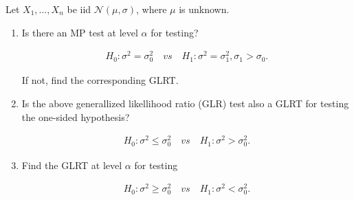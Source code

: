
\begin{exercise}

Let $X_1, \dots, X_n$ be iid $\mathcal N(\mu, \sigma)$, where $\mu$ is unknown.

\begin{enumerate}[label = (\alph*)]

    \item Is there an MP test at level $\alpha$ for testing?
    
    \begin{align*}
        H_0: \sigma^2 = \sigma_0^2
        \quad
        \textit{vs}
        \quad
        H_1: \sigma^2 = \sigma_1^2, \sigma_1 > \sigma_0.
    \end{align*}

    If not, find the corresponding GLRT.

    \item Is the above generallized likellihood ratio (GLR) test also a GLRT for testing the one-sided hypothesis?
    
    \begin{align*}
        H_0: \sigma^2 \leq \sigma_0^2
        \quad
        \textit{vs}
        \quad
        H_1: \sigma^2 > \sigma_0^2.
    \end{align*}

    \item Find the GLRT at level $\alpha$ for testing
    
    \begin{align*}
        H_0: \sigma^2 \geq \sigma_0^2
        \quad
        \textit{vs}
        \quad
        H_1: \sigma^2 < \sigma_0^2.
    \end{align*}

\end{enumerate}

\end{exercise}


\begin{solution}

\phantom{}

\end{solution}

